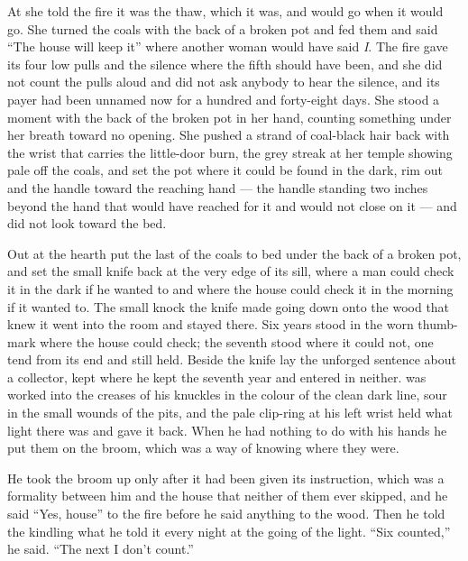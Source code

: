 At  she told the fire it was the thaw, which it was, and would go when it would go. She turned the coals with the back of a broken pot and fed them and said “The house will keep it” where another woman would have said \emph{I}. The fire gave its four low pulls and the silence where the fifth should have been, and she did not count the pulls aloud and did not ask anybody to hear the silence, and its payer had been unnamed now for a hundred and forty-eight days. She stood a moment with the back of the broken pot in her hand, counting something under her breath toward no opening. She pushed a strand of coal-black hair back with the wrist that carries the little-door burn, the grey streak at her temple showing pale off the coals, and set the pot where it could be found in the dark, rim out and the handle toward the reaching hand --- the handle standing two inches beyond the hand that would have reached for it and would not close on it --- and did not look toward the bed.

\scenebreak

Out at the hearth  put the last of the coals to bed under the back of a broken pot, and set the small knife back at the very edge of its sill, where a man could check it in the dark if he wanted to and where the house could check it in the morning if it wanted to. The small knock the knife made going down onto the wood that knew it went into the room and stayed there. Six years stood in the worn thumb-mark where the house could check; the seventh stood where it could not, one tend from its end and still held. Beside the knife lay the unforged sentence about a collector, kept where he kept the seventh year and entered in neither.  was worked into the creases of his knuckles in the colour of the clean dark line, sour in the small wounds of the pits, and the pale clip-ring at his left wrist held what light there was and gave it back. When he had nothing to do with his hands he put them on the broom, which was a way of knowing where they were.

He took the broom up only after it had been given its instruction, which was a formality between him and the house that neither of them ever skipped, and he said “Yes, house” to the fire before he said anything to the wood. Then he told the kindling what he told it every night at the going of the light. “Six counted,” he said. “The next I don't count.”

